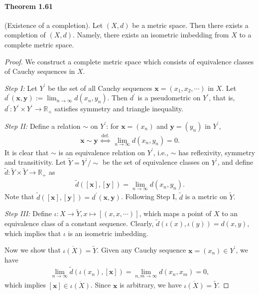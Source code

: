 \documentclass{article}
\begin{document}
\paragraph{Theorem 1.61\label{thm:1.61}} (Existence of a completion). Let $(X,d)$ be a metric space. Then there exists a completion of $(X,d)$. Namely, there exists an isometric imbedding from $X$ to a complete metric space.
\begin{proof}
	We construct a complete metric space which consists of equivalence classes of Cauchy sequences in $X$.
	\vspace{0.1cm}
	
	\textit{Step I:} Let $Y^\prime$ be the set of all Cauchy sequences $\mathbf{x}=(x_1,x_2,\cdots)$ in $X$. Let $d^\prime(\mathbf{x},\mathbf{y}):=\lim_{n\to\infty}d(x_n,y_n)$. Then $d^\prime$ is a pseudometric on $Y^\prime$, that is, $d^\prime:Y^\prime\times Y^\prime\to\mathbb{R}_+$ satisfies symmetry and triangle inequality.
	
	\vspace{0.1cm}
	\textit{Step II:} Define a relation $\sim$ on $Y^\prime$: for $\mathbf{x}=(x_n)$ and $\mathbf{y}=(y_n)$ in $Y^\prime$, 
	\begin{align*}
		\mathbf{x}\sim\mathbf{y}\ \overset{\mathrm{def.}}{\Leftrightarrow}\ \lim_{n\to\infty}d(x_n,y_n)=0.
	\end{align*}
	It is clear that $\sim$ is an equivalence relation on $Y^\prime$, i.e., $\sim$ has reflexivity, symmetry and transitivity. Let $\widetilde{Y}=Y^\prime/\sim$ be the set of equivalence classes on $Y^\prime$, and define $\tilde{d}:\widetilde{Y}\times\widetilde{Y}\to\mathbb{R}_+$ as
	\begin{align*}
		\tilde{d}([\mathbf{x}],[\mathbf{y}])=\lim_{n\to\infty} d(x_n,y_n).
	\end{align*}
	Note that $\tilde{d}([\mathbf{x}],[\mathbf{y}])=d^\prime(\mathbf{x},\mathbf{y})$. Following Step I, $\tilde{d}$ is a metric on $\widetilde{Y}$.
	\vspace{0.1cm}
	
	\textit{Step III:} Define $\iota:X\to\widetilde{Y},x\mapsto[(x,x,\cdots)]$, which maps a point of $X$ to an equivalence class of a constant sequence. Clearly, $\tilde{d}(\iota(x),\iota(y))=d(x,y)$, which implies that $\iota$ is an isometric imbedding.
	
	Now we show that $\overline{\iota(X)}=\widetilde{Y}$. Given any Cauchy sequence $\mathbf{x}=(x_n)\in Y^\prime$, we have
	\begin{align*}
		\lim_{n\to\infty}\tilde{d}(\iota(x_n),[\mathbf{x}])=\lim_{n,m\to\infty} d(x_n,x_m) = 0,
	\end{align*}
	which implies $[\mathbf{x}]\in\overline{\iota(X)}$. Since $\mathbf{x}$ is arbitrary, we have $\overline{\iota(X)}=\widetilde{Y}$.
	

\end{proof}
\end{document}
